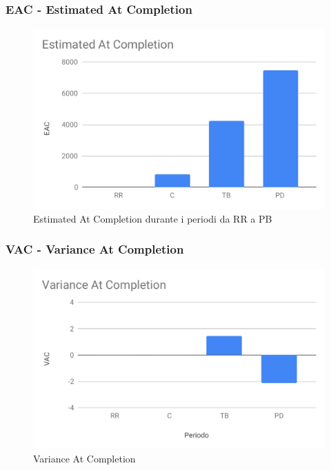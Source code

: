 \subsubsection{EAC - Estimated At Completion}
\begin{figure}[H]
	\centering
	\includegraphics[scale=0.55]{res/images/eac.pdf}
	\caption{Estimated At Completion durante i periodi da RR a PB}
\end{figure}



\subsubsection{VAC - Variance At Completion}

\begin{figure}[H]
	\centering
	\includegraphics[scale=0.8]{res/images/RQ/vac.pdf}
	\caption{Variance At Completion}
\end{figure}
\pagebreak

